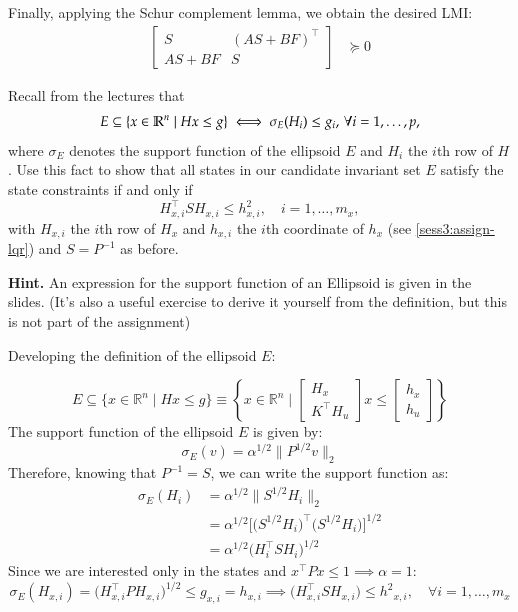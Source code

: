 \documentclass[]{article}
\begin{document}
Finally, applying the Schur complement lemma, we obtain the desired LMI:
\begin{equation}
	\begin{aligned}
		\begin{bmatrix}
			S & (AS + BF)^\top \\ 
			AS + BF & S
		\end{bmatrix} &\succeq 0
	\end{aligned}
\end{equation}



\begin{assignment}\label{sess3:c2}
	Recall from the lectures that 
	\[ 
		E \subseteq \{x \in \mathbb{R}^n \mid Hx \leq g \} \iff \sigma_{E}(H_{i}) \leq g_i, \,\forall i = 1, \dots, p,
	\]
	where $\sigma_E$ denotes the support function of the ellipsoid $E$ and $H_i$ the $i$th row of $H$. 
	Use this fact to show that all states in our candidate invariant set $E$ satisfy the state constraints if and only if 
	\[ 
		H_{x,i}^\top S H_{x,i} \leq h_{x,i}^2, \quad i = 1, \dots, m_x,
	\]
	with $H_{x,i}$ the $i$th row of $H_x$ and $h_{x,i}$ the $i$th coordinate of $h_x$ (see \cref{sess3:assign-lqr})
	and $S = P^{-1}$ as before.

	\textbf{Hint.} An expression for the support function of an Ellipsoid is given in the 
	slides. (It's also a useful exercise to derive it yourself from the definition, but this is not part of the assignment) 
\end{assignment}
\begin{flushleft}
	Developing the definition of the ellipsoid $E$:
\end{flushleft}
\[ 
    E \subseteq \{x \in \mathbb{R}^n \mid Hx \leq g \} \equiv 
    \left\{ x \in \mathbb{R}^n \mid 
    \begin{bmatrix}
        H_x \\
        K^\top H_u
    \end{bmatrix} x \leq 
    \begin{bmatrix}
        h_x \\
        h_u
    \end{bmatrix} 
    \right\}
\]
The support function of the ellipsoid $E$ is given by:
\[ 
	\sigma_E(v) = \alpha^{1/2} \|P^{1/2} v\|_2
\] 
Therefore, knowing that $ P^{-1} = S $, we can write the support function as:
\begin{equation}
	\begin{aligned}
		\sigma_E(H_i) &= \alpha^{1/2} \|S^{1/2} H_i\|_2 \\
					  &= \alpha^{1/2} \Big[ \Big( S^{1/2} H_i \Big)^\top \Big( S^{1/2} H_i \Big) \Big]^{1/2} \\
					  &= \alpha^{1/2} \Big( H_i^\top S H_i \Big)^{1/2}
	\end{aligned}
\end{equation}
Since we are interested only in the states and $x^\top P x \leq 1 \implies \alpha = 1$:
\begin{equation}
		\sigma_E(H_{x,i}) = \Big( H_{x,i}^\top P H_{x,i} \Big)^{1/2} \leq g_{x,i} = h_{x,i} \implies \Big( H_{x,i}^\top S H_{x,i} \Big) \leq {h^2}_{x,i}, \quad \forall i = 1, \dots, m_x
\end{equation}
\end{document}
